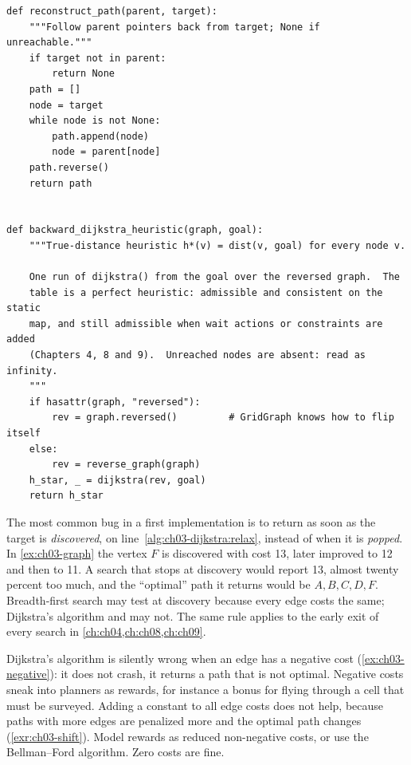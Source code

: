 \begin{lstlisting}[caption={Path reconstruction from the parent pointers and the backward run that produces the true-distance heuristic table (from \code{code/ch03\_dijkstra.py}).},label={lst:ch03-helpers}]
def reconstruct_path(parent, target):
    """Follow parent pointers back from target; None if unreachable."""
    if target not in parent:
        return None
    path = []
    node = target
    while node is not None:
        path.append(node)
        node = parent[node]
    path.reverse()
    return path


def backward_dijkstra_heuristic(graph, goal):
    """True-distance heuristic h*(v) = dist(v, goal) for every node v.

    One run of dijkstra() from the goal over the reversed graph.  The
    table is a perfect heuristic: admissible and consistent on the static
    map, and still admissible when wait actions or constraints are added
    (Chapters 4, 8 and 9).  Unreached nodes are absent: read as infinity.
    """
    if hasattr(graph, "reversed"):
        rev = graph.reversed()         # GridGraph knows how to flip itself
    else:
        rev = reverse_graph(graph)
    h_star, _ = dijkstra(rev, goal)
    return h_star
\end{lstlisting}

\begin{pitfall}
The most common bug in a first implementation is to return as soon as the target is
\emph{discovered}, on line~\ref{alg:ch03-dijkstra:relax}, instead of when it is \emph{popped}.
In \cref{ex:ch03-graph} the vertex $F$ is discovered with cost 13, later improved to 12 and then
to 11. A search that stops at discovery would report 13, almost twenty percent too much, and the
``optimal'' path it returns would be $A,B,C,D,F$. Breadth-first search may test at discovery
because every edge costs the same; Dijkstra's algorithm and \astar may not. The same rule
applies to the early exit of every search in \cref{ch:ch04,ch:ch08,ch:ch09}.
\end{pitfall}

\begin{pitfall}
Dijkstra's algorithm is silently wrong when an edge has a negative cost
(\cref{ex:ch03-negative}): it does not crash, it returns a path that is not optimal. Negative
costs sneak into planners as rewards, for instance a bonus for flying through a cell that must
be surveyed. Adding a constant to all edge costs does not help, because paths with more edges
are penalized more and the optimal path changes (\cref{exr:ch03-shift}). Model rewards as
reduced non-negative costs, or use the Bellman--Ford algorithm. Zero costs are fine.
\end{pitfall}

